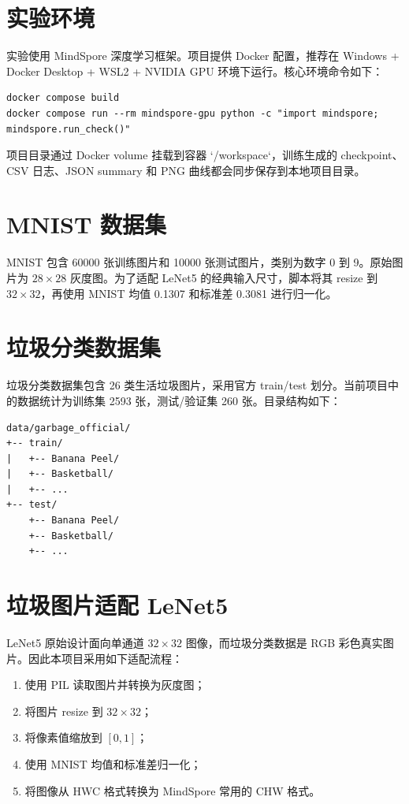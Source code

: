 \documentclass[UTF8,a4paper,zihao=-4]{ctexbook}
\begin{document}
\section{实验环境}

实验使用 MindSpore 深度学习框架。项目提供 Docker 配置，推荐在 Windows + Docker Desktop + WSL2 + NVIDIA GPU 环境下运行。核心环境命令如下：

\begin{verbatim}
docker compose build
docker compose run --rm mindspore-gpu python -c "import mindspore; mindspore.run_check()"
\end{verbatim}

项目目录通过 Docker volume 挂载到容器 `/workspace`，训练生成的 checkpoint、CSV 日志、JSON summary 和 PNG 曲线都会同步保存到本地项目目录。

\section{MNIST 数据集}

MNIST 包含 60000 张训练图片和 10000 张测试图片，类别为数字 0 到 9。原始图片为 $28 \times 28$ 灰度图。为了适配 LeNet5 的经典输入尺寸，脚本将其 resize 到 $32 \times 32$，再使用 MNIST 均值 0.1307 和标准差 0.3081 进行归一化。

\section{垃圾分类数据集}

垃圾分类数据集包含 26 类生活垃圾图片，采用官方 train/test 划分。当前项目中的数据统计为训练集 2593 张，测试/验证集 260 张。目录结构如下：

\begin{verbatim}
data/garbage_official/
+-- train/
|   +-- Banana Peel/
|   +-- Basketball/
|   +-- ...
+-- test/
    +-- Banana Peel/
    +-- Basketball/
    +-- ...
\end{verbatim}

\section{垃圾图片适配 LeNet5}

LeNet5 原始设计面向单通道 $32 \times 32$ 图像，而垃圾分类数据是 RGB 彩色真实图片。因此本项目采用如下适配流程：

\begin{enumerate}[label=(\arabic*)]
    \item 使用 PIL 读取图片并转换为灰度图；
    \item 将图片 resize 到 $32 \times 32$；
    \item 将像素值缩放到 $[0,1]$；
    \item 使用 MNIST 均值和标准差归一化；
    \item 将图像从 HWC 格式转换为 MindSpore 常用的 CHW 格式。
\end{enumerate}
\end{document}
